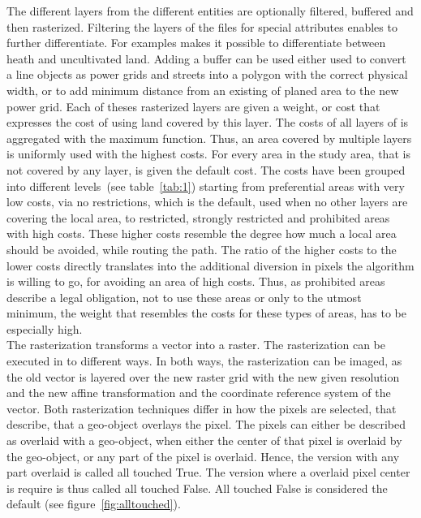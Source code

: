 The different layers from the different entities are optionally filtered, buffered and then rasterized.
Filtering the layers of the files for special attributes enables to further differentiate.
For examples makes it possible to differentiate between heath and uncultivated land.
Adding a buffer can be used either used to convert a line objects as power grids and streets into a polygon with the
correct physical width, or to add minimum distance from an existing of planed area to the new power grid.
	Each of theses rasterized layers are given a weight, or cost that expresses the cost of using land covered by this layer.
	The costs of all layers of is aggregated with the maximum function.
Thus, an area covered by multiple layers is uniformly used with the highest costs.
For every area in the study area, that is not covered by any layer, is given the default cost.
The costs have been grouped into different levels~(see table~\ref{tab:1}) starting from preferential areas with
very low costs, via no restrictions, which is the default, used when no other layers are covering the local area,
to restricted, strongly restricted and prohibited areas with high costs.
These higher costs resemble the degree how much a local area should be avoided, while routing the path.
The ratio of the higher costs to the lower costs directly translates into the additional diversion in pixels
the algorithm is willing to go, for avoiding an area of high costs.
Thus, as prohibited areas describe a legal obligation, not to use these areas or only to the utmost minimum,
the weight that resembles the costs for these types of areas, has to be especially high. \\
The rasterization transforms a vector into a raster.
The rasterization can be executed in to different ways.
In both ways, the rasterization can be imaged, as the old vector is layered over the new raster grid with the new
given resolution and the new affine transformation and the coordinate reference system of the vector.
Both rasterization techniques differ in how the pixels are selected, that describe, that a geo-object overlays the pixel.
The pixels can either be described as overlaid with a geo-object, when either the center of that pixel is overlaid
by the geo-object, or any part of the pixel is overlaid.
Hence, the version with any part overlaid is called all touched True.
The version where a overlaid pixel center is require is thus called all touched False.
All touched False is considered the default (see figure~\ref{fig:alltouched}).
